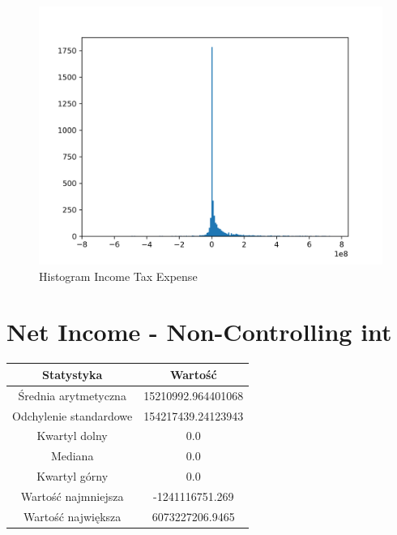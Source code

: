 \documentclass{article}
\begin{document}
\begin{figure}[h!]
    \includegraphics[width=\linewidth]{variables/Income Tax Expense.png}
    \caption{Histogram Income Tax Expense }
\end{figure}\section{ Net Income - Non-Controlling int }

\begin{center}
    \begin{tabular}{|c | c|} 
    \hline
    Statystyka & Wartość \\
    \hline\hline
    Średnia arytmetyczna & 15210992.964401068 \\ 
    \hline
    Odchylenie standardowe & 154217439.24123943 \\
    \hline
    Kwartyl dolny & 0.0 \\
    \hline
    Mediana & 0.0 \\
    \hline
    Kwartyl górny & 0.0 \\
    \hline
    Wartość najmniejsza & -1241116751.269 \\
    \hline
    Wartość największa & 6073227206.9465 \\
    \hline
   \end{tabular}
\end{center}
\end{document}

